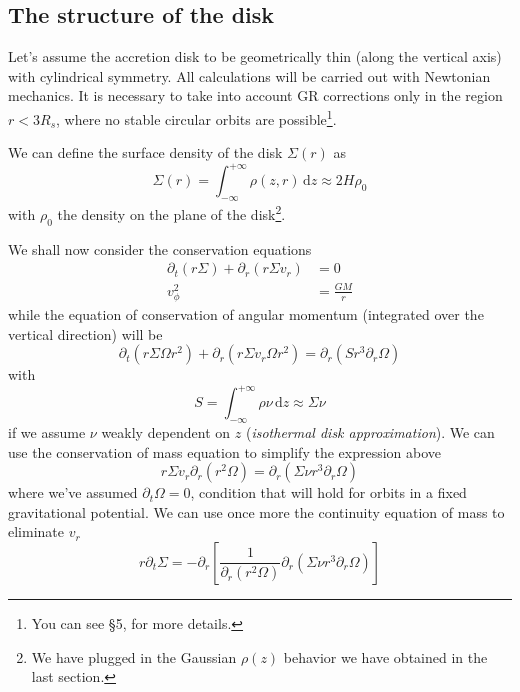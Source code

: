 \subsection{The structure of the disk}
Let's assume the accretion disk to be geometrically thin (along the vertical axis) with cylindrical symmetry. All calculations will be carried out with Newtonian mechanics. It is necessary to take into account GR corrections only in the region $r<3R_{s}$, where no stable circular orbits are possible\footnote{You can see \cite{carroll} §5, for more details.}.
\par We can define the surface density of the disk $\Sigma(r)$ as 
\begin{equation}
    \Sigma(r) = \int_{-\infty}^{+\infty} \rho(z,r)\,\text{d}z \approx 2H\rho_{0}
\end{equation}
with $\rho_{0}$ the density on the plane of the disk\footnote{We have plugged in the Gaussian $\rho(z)$ behavior we have obtained in the last section.}.
\par We shall now consider the conservation equations 
\begin{align}
    \partial_{t}(r\Sigma) + \partial_{r}(r\Sigma v_{r}) &= 0\\
    v_{\phi}^{2} &= \frac{GM}{r}
    \label{eq:cons_sh-su}
\end{align}
while the equation of conservation of angular momentum (integrated over the vertical direction) will be
\begin{equation}
    \partial_{t}(r\Sigma\Omega r^{2}) + \partial_{r}(r\Sigma v_{r}\Omega r^{2}) = \partial_{r}(S r^{3}\partial_{r}\Omega)
\end{equation}
with 
\begin{equation*}
    S = \int_{-\infty}^{+\infty} \rho\nu\,\text{d}z \approx \Sigma \nu
\end{equation*}
if we assume $\nu$ weakly dependent on $z$ (\emph{isothermal disk approximation}). We can use the conservation of mass equation to simplify the expression above
\begin{equation*}
    r\Sigma v_{r} \partial_{r}(r^{2}\Omega) = \partial_{r}(\Sigma \nu r^{3}\partial_{r}\Omega)
\end{equation*}
where we've assumed $\partial_{t}\Omega = 0$, condition that will hold for orbits in a fixed gravitational potential. We can use once more the continuity equation of mass to eliminate $v_{r}$
\begin{equation*}
    r\partial_{t}\Sigma = -\partial_{r}\left[\frac{1}{\partial_{r}(r^{2}\Omega)}\partial_{r}(\Sigma \nu r^{3}\partial_{r}\Omega)\right]
\end{equation*}
